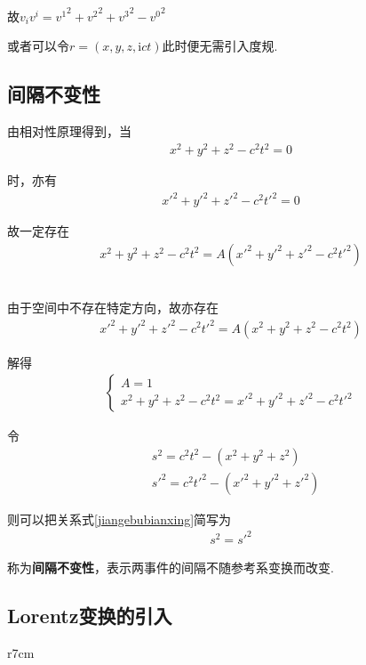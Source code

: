 \documentclass[main.tex]{subfiles}
\begin{document}
故$v_iv^i = {v^1}^2+{v^2}^2+{v^3}^2-{v^0}^2$

或者可以令$r = (x,y,z,\mathrm{i}ct)$此时便无需引入度规.

\subsection{间隔不变性}
由相对性原理得到，当
\begin{align}
    x^2 + y^2 + z^2 -c^2t^2 = 0
\end{align}

时，亦有
\begin{align}
    x'^2 + y'^2 + z'^2 -c^2t'^2 = 0
\end{align}

故一定存在
\begin{align}
    x^2 + y^2 + z^2 -c^2t^2 = A(x'^2 + y'^2 + z'^2 -c^2t'^2 )
\end{align}\

由于空间中不存在特定方向，故亦存在
\begin{align}
    x'^2 + y'^2 + z'^2 -c^2t'^2 = A(x^2 + y^2 + z^2 -c^2t^2)
\end{align}

解得
\begin{align}
    \label{jiangebubianxing}\left\{\begin{array}{l}
    A = 1\\
    x^2 + y^2 + z^2 -c^2t^2 = x'^2 + y'^2 + z'^2 -c^2t'^2
    \end{array}\right.
\end{align}

令
\begin{align}
    &s^2 = c^2t^2 - (x^2 + y^2 +z^2)\\
    &s'^2 = c^2t'^2 - (x'^2 + y'^2 +z'^2)
\end{align}

则可以把关系式\ref{jiangebubianxing}简写为
\begin{align}
    s^2 = s'^2
\end{align}

称为\textbf{间隔不变性}，表示两事件的间隔不随参考系变换而改变.

\subsection{Lorentz变换的引入}

\begin{wrapfigure}{r}{7cm}
	\centering
    
\end{wrapfigure}
\end{document}

